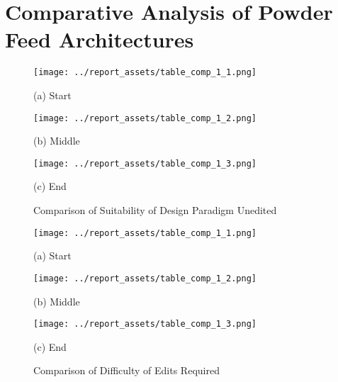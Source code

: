 \chapter{Comparative Analysis of Powder Feed Architectures}

\begin{figure}[htbp]
    \centering

    \begin{minipage}{0.5\textwidth}
        \centering
        \texttt{[image: ../report\_assets/table\_comp\_1\_1.png]}
        \caption{(a) Start}
    \end{minipage}
    \begin{minipage}{0.5\textwidth}
        \centering
        \texttt{[image: ../report\_assets/table\_comp\_1\_2.png]}
        \caption{(b) Middle}
    \end{minipage}
    \begin{minipage}{0.5\textwidth}
        \centering
        \texttt{[image: ../report\_assets/table\_comp\_1\_3.png]}
        \caption{(c) End}
    \end{minipage}
    \caption{Comparison of Suitability of Design Paradigm Unedited}
\end{figure}

\begin{figure}[htbp]
    \centering

    \begin{minipage}{0.5\textwidth}
        \centering
        \texttt{[image: ../report\_assets/table\_comp\_1\_1.png]}
        \caption{(a) Start}
    \end{minipage}
    \begin{minipage}{0.5\textwidth}
        \centering
        \texttt{[image: ../report\_assets/table\_comp\_1\_2.png]}
        \caption{(b) Middle}
    \end{minipage}
    \begin{minipage}{0.5\textwidth}
        \centering
        \texttt{[image: ../report\_assets/table\_comp\_1\_3.png]}
        \caption{(c) End}
    \end{minipage}
    \caption{Comparison of Difficulty of Edits Required}
\end{figure}

